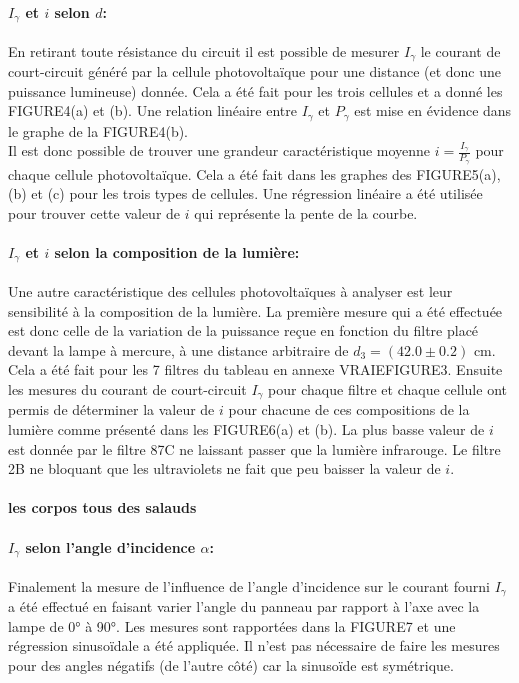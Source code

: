 \paragraph*{\(I_\gamma\) et \(i\) selon \(d\):}
En retirant toute résistance du circuit il est possible de mesurer \(I_\gamma\) le courant de court-circuit généré par la cellule photovoltaïque pour une distance (et donc une puissance lumineuse) donnée. Cela a été fait pour les trois cellules et a donné les FIGURE4(a) et (b). Une relation linéaire entre \(I_\gamma\) et \(P_\gamma\) est mise en évidence dans le graphe de la FIGURE4(b). \\
Il est donc possible de trouver une grandeur caractéristique moyenne \(i = \frac{I_\gamma}{P_\gamma}\) pour chaque cellule photovoltaïque. Cela a été fait dans les graphes des FIGURE5(a), (b) et (c) pour les trois types de cellules. Une régression linéaire a été utilisée pour trouver cette valeur de \(i\) qui représente la pente de la courbe.

\paragraph*{\(I_\gamma\) et \(i\) selon la composition de la lumière:}
Une autre caractéristique des cellules photovoltaïques à analyser est leur sensibilité à la composition de la lumière. La première mesure qui a été effectuée est donc celle de la variation de la puissance reçue en fonction du filtre placé devant la lampe à mercure, à une distance arbitraire de \(d_3 = (42.0 \pm 0.2)\) \unit{\centi\meter}. Cela a été fait pour les 7 filtres du tableau en annexe VRAIEFIGURE3. Ensuite les mesures du courant de court-circuit \(I_\gamma\) pour chaque filtre et chaque cellule ont permis de déterminer la valeur de \(i\) pour chacune de ces compositions de la lumière comme présenté dans les FIGURE6(a) et (b). La plus basse valeur de \(i\) est donnée par le filtre 87C ne laissant passer que la lumière infrarouge. Le filtre 2B ne bloquant que les ultraviolets ne fait que peu baisser la valeur de \(i\).

\paragraph*{les corpos tous des salauds}


\paragraph*{\(I_\gamma\) selon l'angle d'incidence \(\alpha\):}
Finalement la mesure de l'influence de l'angle d'incidence sur le courant fourni \(I_\gamma\) a été effectué en faisant varier l'angle du panneau par rapport à l'axe avec la lampe de 0° à 90°. Les mesures sont rapportées dans la FIGURE7 et une régression sinusoïdale a été appliquée. Il n'est pas nécessaire de faire les mesures pour des angles négatifs (de l'autre côté) car la sinusoïde est symétrique.






